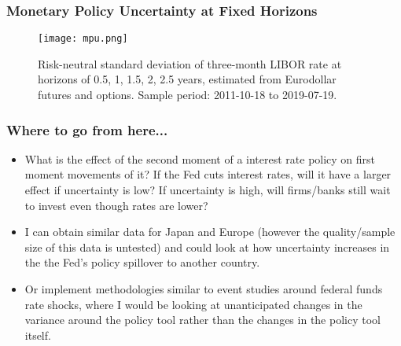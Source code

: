 \documentclass{beamer}
\begin{document}
\begin{frame}
\frametitle{Monetary Policy Uncertainty at Fixed Horizons}
\begin{figure}
	\centering
	\texttt{[image: mpu.png]}
	\caption{Risk-neutral standard deviation of three-month LIBOR rate at horizons of 0.5, 1, 1.5, 2, 2.5 years, estimated from Eurodollar futures and options. Sample period: 2011-10-18 to 2019-07-19.}
\end{figure}

\end{frame}

\begin{frame}
\frametitle{Where to go from here...}
	\begin{itemize}
		\item What is the effect of the second moment of a interest rate policy on first moment movements of it? If the Fed cuts interest rates, will it have a larger effect if uncertainty is low? If uncertainty is high, will firms/banks still wait to invest even though rates are lower? \item I can obtain similar data for Japan and Europe (however the quality/sample size of this data is untested) and could look at how uncertainty increases in the the Fed's policy spillover to another country. 
		\item Or implement methodologies similar to event studies around federal funds rate shocks, where I would be looking at unanticipated changes in the variance around the policy tool rather than the changes in the policy tool itself. 
		
	\end{itemize}
\end{frame}
\end{document}

